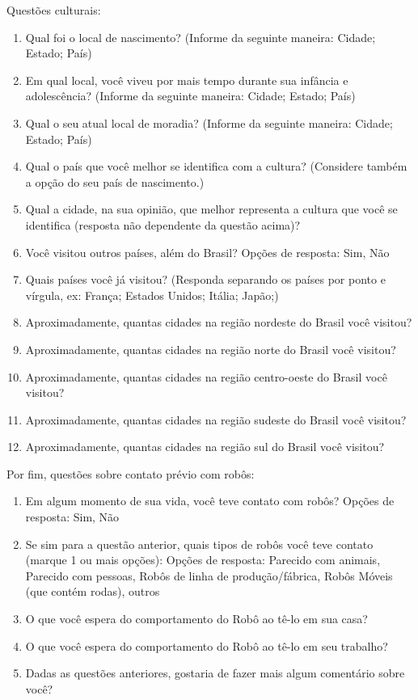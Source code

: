 Questões culturais:

\begin{enumerate}
	\item Qual foi o local de nascimento? (Informe da seguinte maneira: Cidade; Estado; País)
	\item Em qual local, você viveu por mais tempo durante sua infância e adolescência? (Informe da seguinte maneira: Cidade; Estado; País)
	\item Qual o seu atual local de moradia? (Informe da seguinte maneira: Cidade; Estado; País)
	\item Qual o país que você melhor se identifica com a cultura? (Considere também a opção do seu país de nascimento.)
	\item Qual a cidade, na sua opinião, que melhor representa a cultura que você se identifica (resposta não dependente da questão acima)?
	\item Você visitou outros países, além do Brasil? Opções de resposta: Sim, Não
	\item Quais países você já visitou? (Responda separando os países por ponto e vírgula, ex: França; Estados Unidos; Itália; Japão;)
	\item Aproximadamente, quantas cidades na região nordeste do Brasil você visitou?
	\item Aproximadamente, quantas cidades na região norte do Brasil você visitou?
	\item Aproximadamente, quantas cidades na região centro-oeste do Brasil você visitou?
	\item Aproximadamente, quantas cidades na região sudeste do Brasil você visitou?
	\item Aproximadamente, quantas cidades na região sul do Brasil você visitou?
\end{enumerate}

Por fim, questões sobre contato prévio com robôs:

\begin{enumerate}
	\item Em algum momento de sua vida, você teve contato com robôs? Opções de resposta: Sim, Não
	\item Se sim para a questão anterior, quais tipos de robôs você teve contato (marque 1 ou mais opções): Opções de resposta: Parecido com animais, Parecido com pessoas, Robôs de linha de produção/fábrica, Robôs Móveis (que contém rodas), outros
	\item O que você espera do comportamento do Robô ao tê-lo em sua casa?
	\item O que você espera do comportamento do Robô ao tê-lo em seu trabalho?
	\item Dadas as questões anteriores, gostaria de fazer mais algum comentário sobre você?
\end{enumerate}


